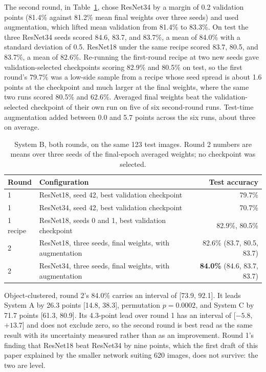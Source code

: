 \documentclass[12pt,letterpaper]{article}
\begin{document}
The second round, in Table~\ref{tab:round2}, chose ResNet34 by a
margin of 0.2 validation points (81.4\% against 81.2\% mean final
weights over three seeds) and used augmentation, which lifted mean
validation from 81.4\% to 83.3\%. On test the three ResNet34 seeds
scored 84.6, 83.7, and 83.7\%, a mean of 84.0\% with a standard
deviation of 0.5. ResNet18 under the same recipe scored 83.7, 80.5, and
83.7\%, a mean of 82.6\%. Re-running the first-round recipe at two
new seeds gave validation-selected checkpoints scoring 82.9\% and
80.5\% on test, so the first round's 79.7\% was a low-side sample from
a recipe whose seed spread is about 1.6 points at the checkpoint and
much larger at the final weights, where the same two runs scored 80.5\%
and 62.6\%. Averaged final weights beat the validation-selected
checkpoint of their own run on five of six second-round runs. Test-time
augmentation added between 0.0 and 5.7 points across the six runs,
about three on average.

\begin{table}[H]
\centering
\caption{System B, both rounds, on the same 123 test images. Round 2
numbers are means over three seeds of the final-epoch averaged weights;
no checkpoint was selected.}
\label{tab:round2}
\begin{tabular}{llr}
\toprule
Round & Configuration & Test accuracy \\
\midrule
1 & ResNet18, seed 42, best validation checkpoint & 79.7\% \\
1 & ResNet34, seed 42, best validation checkpoint & 70.7\% \\
1 recipe & ResNet18, seeds 0 and 1, best validation checkpoint & 82.9\%, 80.5\% \\
2 & ResNet18, three seeds, final weights, with augmentation & 82.6\% (83.7, 80.5, 83.7) \\
2 & ResNet34, three seeds, final weights, with augmentation & \textbf{84.0\%} (84.6, 83.7, 83.7) \\
\bottomrule
\end{tabular}
\end{table}

Object-clustered, round 2's 84.0\% carries an interval of [73.9,
92.1]. It leads System A by 26.3 points [14.8, 38.3], permutation
$p = 0.0002$, and System C by 71.7 points [61.3, 80.9]. Its 4.3-point
lead over round 1 has an interval of [$-5.8$, $+13.7$] and does not
exclude zero, so the second round is best read as the same result with
its uncertainty measured rather than as an improvement. Round 1's
finding that ResNet18 beat ResNet34 by nine points, which the first
draft of this paper explained by the smaller network suiting 620
images, does not survive: the two are level.
\end{document}
